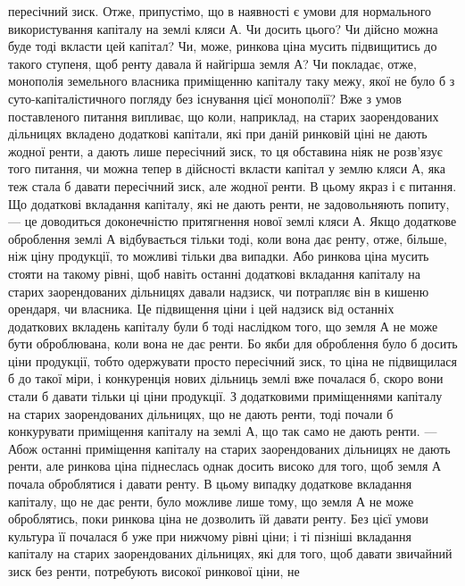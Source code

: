 \parcont{}  %
пересічний зиск. Отже, припустімо, що в наявності є умови для нормального
використування капіталу на землі кляси $А$. Чи досить цього? Чи дійсно можна
буде тоді вкласти цей капітал? Чи, може, ринкова ціна мусить підвищитись
до такого ступеня, щоб ренту давала й найгірша земля $А$? Чи покладає, отже,
монополія земельного власника приміщенню капіталу таку межу, якої не було б
з суто-капіталістичного погляду без існування цієї монополії? Вже з умов поставленого
питання випливає, що коли, наприклад, на старих заорендованих
дільницях вкладено додаткові капітали, які при даній ринковій ціні не дають
жодної ренти, а дають лише пересічний зиск, то ця обставина ніяк не розв'язує
того питання, чи можна тепер в дійсності вкласти капітал у землю кляси $А$,
яка теж стала б давати пересічний зиск, але жодної ренти. В цьому якраз і є
питання. Що додаткові вкладання капіталу, які не дають ренти, не задовольняють
попиту, — це доводиться доконечністю притягнення нової землі кляси $А$. Якщо
додаткове оброблення землі $А$ відбувається тільки тоді, коли вона дає ренту,
отже, більше, ніж ціну продукції, то можливі тільки два випадки. Або ринкова
ціна мусить стояти на такому рівні, щоб навіть останні додаткові вкладання
капіталу на старих заорендованих дільницях давали надзиск, чи потрапляє він
в кишеню орендаря, чи власника. Це підвищення ціни і цей надзиск від останніх
додаткових вкладень капіталу були б тоді наслідком того, що земля $А$ не може
бути оброблювана, коли вона не дає ренти. Бо якби для оброблення було б
досить ціни продукції, тобто одержувати просто пересічний зиск, то ціна не
підвищилася б до такої міри, і конкуренція нових дільниць землі вже почалася
б, скоро вони стали б давати тільки ці ціни продукції. З додатковими
приміщеннями капіталу на старих заорендованих дільницях, що не дають ренти,
тоді почали б конкурувати приміщення капіталу на землі $А$, що так само не
дають ренти. — Абож останні приміщення капіталу на старих заорендованих
дільницях не дають ренти, але ринкова ціна піднеслась однак досить високо
для того, щоб земля $А$ почала оброблятися і давати ренту. В цьому випадку
додаткове вкладання капіталу, що не дає ренти, було можливе лише тому, що
земля $А$ не може оброблятись, поки ринкова ціна не дозволить їй давати ренту.
Без цієї умови культура її почалася б уже при нижчому рівні ціни; і ті пізніші
вкладання капіталу на старих заорендованих дільницях, які для того,
щоб давати звичайний зиск без ренти, потребують високої ринкової ціни, не
